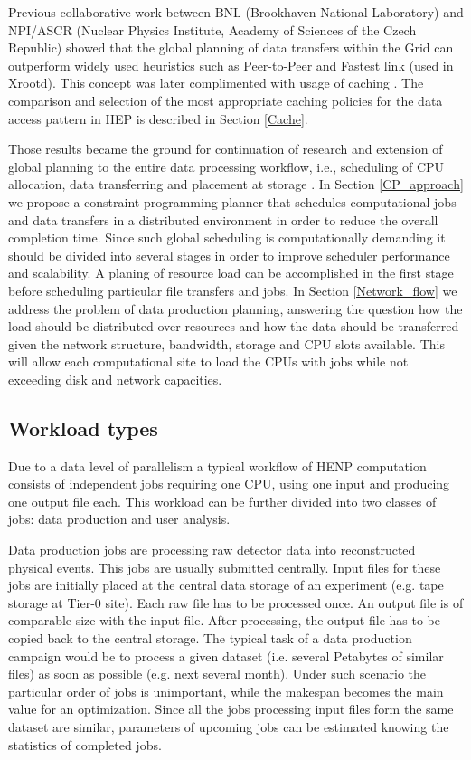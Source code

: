 \documentclass[english]{ddny}
\begin{document}
Previous collaborative work between BNL (Brookhaven National Laboratory) and NPI/ASCR (Nuclear Physics Institute, Academy of Sciences of the Czech Republic) showed that the global planning of data transfers within the Grid can outperform widely used heuristics such as Peer-to-Peer and Fastest link (used in Xrootd)\cite{Zerola}. This concept was later complimented with usage of caching \cite{Makatun_cache}. The comparison and selection of the most appropriate caching policies for the data access pattern in HEP is described in Section \ref{Cache}. 
 
Those results became the ground for continuation of research and extension of global planning to the entire data processing workflow, i.e., scheduling of CPU allocation, data transferring and  placement at storage \cite{ACAT_cp,MISTA}. In Section \ref{CP_approach} we propose a constraint programming planner that schedules computational jobs and data transfers in a distributed environment in order to reduce the overall completion time. Since such global scheduling is computationally demanding it should be divided into several stages in order to improve scheduler performance and scalability. A planing of resource load can be accomplished in the first stage before scheduling particular file transfers and jobs. In Section \ref{Network_flow} we address the problem of data production planning, answering the question how the load should be distributed over resources and how the data should be transferred given the network structure, bandwidth, storage and CPU slots available. This will allow each computational site to load the CPUs with jobs while not exceeding disk and network capacities.

\subsection{Workload types}
Due to a data level of parallelism a typical workflow of HENP computation
consists of independent jobs requiring one CPU,  using one input and producing one output file each. This workload can be further divided into two classes of jobs: data production and user analysis.

Data production jobs are processing raw detector data into reconstructed physical events. This jobs are usually submitted centrally. Input files for these jobs are initially placed at the central data storage of an experiment (e.g. tape storage at Tier-0 site). Each raw file has to be processed once. An output file is of comparable size with the input file. After processing, the output file has to be copied back to the central storage. The typical task of a data production campaign would be to process a given dataset (i.e. several Petabytes of similar files) as soon as possible (e.g. next several month). Under such scenario the particular order of jobs is unimportant, while the makespan becomes the main value for an optimization. Since all the jobs processing input files form the same dataset are similar, parameters of upcoming jobs can be estimated knowing the statistics of completed jobs.
\end{document}

